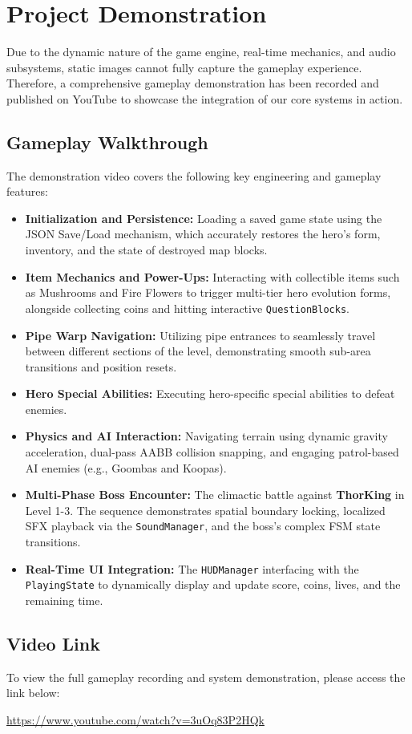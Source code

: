 \section{Project Demonstration}

Due to the dynamic nature of the game engine, real-time mechanics, and audio subsystems, static images cannot fully capture the gameplay experience. Therefore, a comprehensive gameplay demonstration has been recorded and published on YouTube to showcase the integration of our core systems in action.

\subsection{Gameplay Walkthrough}
The demonstration video covers the following key engineering and gameplay features:
\begin{itemize}
    \item \textbf{Initialization and Persistence:} Loading a saved game state using the JSON Save/Load mechanism, which accurately restores the hero's form, inventory, and the state of destroyed map blocks.
    \item \textbf{Item Mechanics and Power-Ups:} Interacting with collectible items such as Mushrooms and Fire Flowers to trigger multi-tier hero evolution forms, alongside collecting coins and hitting interactive \texttt{QuestionBlocks}.
    \item \textbf{Pipe Warp Navigation:} Utilizing pipe entrances to seamlessly travel between different sections of the level, demonstrating smooth sub-area transitions and position resets.
    \item \textbf{Hero Special Abilities:} Executing hero-specific special abilities to defeat enemies.
    \item \textbf{Physics and AI Interaction:} Navigating terrain using dynamic gravity acceleration, dual-pass AABB collision snapping, and engaging patrol-based AI enemies (e.g., Goombas and Koopas).
    \item \textbf{Multi-Phase Boss Encounter:} The climactic battle against \textbf{ThorKing} in Level 1-3. The sequence demonstrates spatial boundary locking, localized SFX playback via the \texttt{SoundManager}, and the boss's complex FSM state transitions.
    \item \textbf{Real-Time UI Integration:} The \texttt{HUDManager} interfacing with the \texttt{PlayingState} to dynamically display and update score, coins, lives, and the remaining time.
\end{itemize}

\subsection{Video Link}
To view the full gameplay recording and system demonstration, please access the link below:

\begin{center}
\url{https://www.youtube.com/watch?v=3uOq83P2HQk}
\end{center}